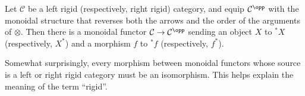 \begin{corollary}
	Let $\mathcal{C}$ be a left rigid (respectively, right rigid) category, and equip $\mathcal{C}^{\opp}$ with the monoidal structure that reverses both the arrows and the order of the arguments of $\otimes$. Then there is a monoidal functor $\mathcal{C} \to \mathcal{C}^{\opp}$ sending an object $X$ to ${}^* X$ (respectively, $X^*$) and a morphism $f$ to ${}^* f$ (respectively, $f^*$).
\end{corollary}

Somewhat surprisingly, every morphism between monoidal functors whose source is a left or right rigid category must be an isomorphism. This helps explain the meaning of the term ``rigid''.

